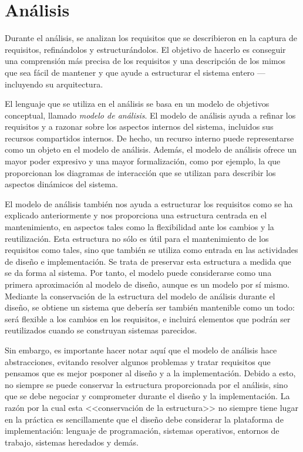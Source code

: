 \chapter{Análisis} %
	\label{cha:analisis}

	Durante el análisis, se analizan los requisitos que se describieron en la captura de requisitos, refinándolos y estructurándolos. El objetivo de hacerlo es conseguir una comprensión más precisa de los requisitos y una descripción de los mimos que sea fácil de mantener y que ayude a estructurar el sistema entero ---incluyendo su arquitectura.

	El lenguaje que se utiliza en el análisis se basa en un modelo de objetivos conceptual, llamado {\it modelo de análisis}. El modelo de análisis ayuda a refinar los requisitos y a razonar sobre los aspectos internos del sistema, incluidos sus recursos compartidos internos. De hecho, un recurso interno puede representarse como un objeto en el modelo de análisis. Además, el modelo de análisis ofrece un mayor poder expresivo y una mayor formalización, como por ejemplo, la que proporcionan los diagramas de interacción que se utilizan para describir los aspectos dinámicos del sistema.
	
	El modelo de análisis también nos ayuda a estructurar los requisitos como se ha explicado anteriormente y nos proporciona una estructura centrada en el mantenimiento, en aspectos tales como la flexibilidad ante los cambios y la reutilización. Esta estructura no sólo es útil para el mantenimiento de los requisitos como tales, sino que también se utiliza como entrada en las actividades de diseño e implementación. Se trata de preservar esta estructura a medida que se da forma al sistema. Por tanto, el modelo puede considerarse como una primera aproximación al modelo de diseño, aunque es un modelo por sí mismo. Mediante la conservación de la estructura del modelo de análisis durante el diseño, se obtiene un sistema que debería ser también mantenible como un todo: será flexible a los cambios en los requisitos, e incluirá elementos que podrán ser reutilizados cuando se construyan sistemas parecidos.
	
	Sin embargo, es importante hacer notar aquí que el modelo de análisis hace abstracciones, evitando resolver algunos problemas y tratar requisitos que pensamos que es mejor posponer al diseño y a la implementación. Debido a esto, no siempre se puede conservar la estructura proporcionada por el análisis, sino que se debe negociar y comprometer durante el diseño y la implementación. La razón por la cual esta <<conservación de la estructura>> no siempre tiene lugar en la práctica es sencillamente que el diseño debe considerar la plataforma de implementación: lenguaje de programación, sistemas operativos, entornos de trabajo, sistemas heredados y demás.
	
